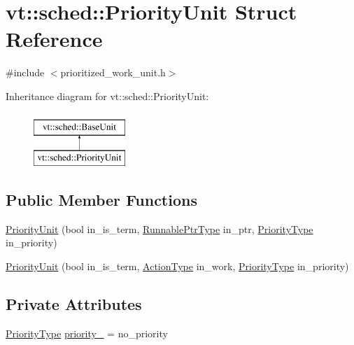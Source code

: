 \hypertarget{structvt_1_1sched_1_1_priority_unit}{}\section{vt\+:\+:sched\+:\+:Priority\+Unit Struct Reference}
\label{structvt_1_1sched_1_1_priority_unit}


{\ttfamily \#include $<$prioritized\+\_\+work\+\_\+unit.\+h$>$}

Inheritance diagram for vt\+:\+:sched\+:\+:Priority\+Unit\+:\begin{figure}[H]
\begin{center}
\leavevmode
\includegraphics[height=2.000000cm]{structvt_1_1sched_1_1_priority_unit}
\end{center}
\end{figure}
\subsection*{Public Member Functions}
\begin{DoxyCompactItemize}
\item 
\hyperlink{structvt_1_1sched_1_1_priority_unit_ae8a2706424c4e84db8be30fe59c21718}{Priority\+Unit} (bool in\+\_\+is\+\_\+term, \hyperlink{structvt_1_1sched_1_1_base_unit_ab635b72e57c53fa666d30bbfe5a0df17}{Runnable\+Ptr\+Type} in\+\_\+ptr, \hyperlink{namespacevt_a86bff9f556eb761b27fc8600d006ac04}{Priority\+Type} in\+\_\+priority)
\item 
\hyperlink{structvt_1_1sched_1_1_priority_unit_aeea5316b975f9c1bde33a5cc3dfb1631}{Priority\+Unit} (bool in\+\_\+is\+\_\+term, \hyperlink{namespacevt_ae0a5a7b18cc99d7b732cb4d44f46b0f3}{Action\+Type} in\+\_\+work, \hyperlink{namespacevt_a86bff9f556eb761b27fc8600d006ac04}{Priority\+Type} in\+\_\+priority)
\end{DoxyCompactItemize}
\subsection*{Private Attributes}
\begin{DoxyCompactItemize}
\item 
\hyperlink{namespacevt_a86bff9f556eb761b27fc8600d006ac04}{Priority\+Type} \hyperlink{structvt_1_1sched_1_1_priority_unit_ad8f7fe9067612b7902a6258f3260cfac}{priority\+\_\+} = no\+\_\+priority
\end{DoxyCompactItemize}
